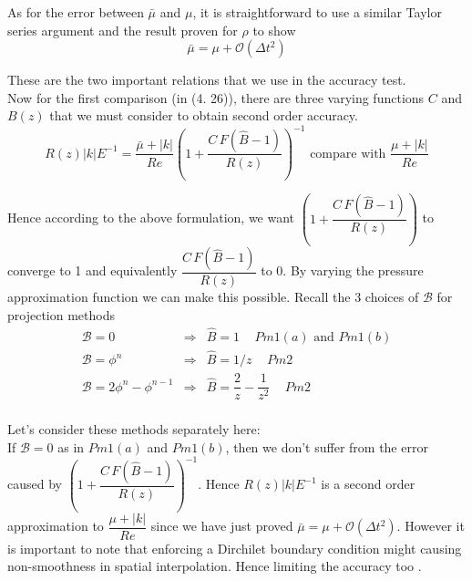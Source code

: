 As for the error between $\bar{\mu}$ and $\mu$, it is straightforward to use a similar Taylor series argument and the result proven for $\rho$ to show 
\begin{equation}
\bar{\mu} = \mu + \mathcal{O}(\Delta t^2)
\end{equation}

These are the two important relations that we use in the accuracy test.\\

Now for the first comparison (in (4. 26)), there are three varying functions $C$ and $B(z)$ that we must consider to obtain second order accuracy.
\begin{equation*}
R(z) |k|E^{-1} = \dfrac{\bar{\mu} + |k|}{Re}(1 + \dfrac{C \, F(\hat{B} - 1)}{R(z)})^{-1} \text{ compare with } \dfrac{\mu + |k|}{Re} 
\end{equation*}

Hence according to the above formulation, we want $(1 + \dfrac{C \, F(\hat{B} - 1)}{R(z)})$ to converge to 1 and equivalently $\dfrac{C \, F(\hat{B} - 1)}{R(z)}$ to 0. By varying the pressure approximation function we can make this possible. Recall the 3 choices of $\mathcal{B}$ for projection methods
\begin{equation}
\begin{array}{lcl}
\mathcal{B} = 0 & \Rightarrow & \hat{B} = 1 \, \, \, \text{      $Pm 1 (a)$ and $Pm 1 (b)$}\\

\mathcal{B} = \phi^n & \Rightarrow & \hat{B} = 1/z \, \, \, \text{      $Pm 2$}\\

\mathcal{B} = 2\phi^n - \phi^{n-1} & \Rightarrow & \hat{B} = \dfrac{2}{z} - \dfrac{1}{z^2} \, \, \, \text{         $Pm 2$}\\
\end{array}
\end{equation}

Let's consider these methods separately here:\\

If $\mathcal{B} = 0$ as in $Pm 1 (a)$ and $Pm 1 (b)$, then we don't suffer from the error caused by $(1 + \dfrac{C \, F(\hat{B} - 1)}{R(z)})^{-1}$. Hence $R(z) |k|E^{-1}$ is a second order approximation to $\dfrac{\mu + |k|}{Re} $ since we have just proved $\bar{\mu} = \mu + \mathcal{O} (\Delta t^2)$. However it is important to note that enforcing a Dirchilet boundary condition might causing non-smoothness in spatial interpolation. Hence limiting the accuracy too \cite{strikwerda1999accuracy}.\\

